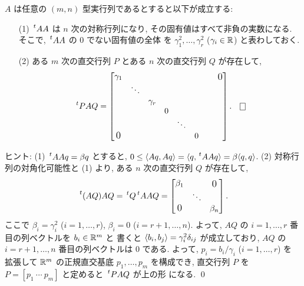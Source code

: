\documentclass[12pt,twoside]{jarticle}
\begin{document}
\begin{question}
\label{q:real-PAQ}
  $A$ は任意の $(m,n)$ 型実行列であるとすると以下が成立する:
  \begin{enumerate}
  \item[(1)] $\tp{A}A$ は $n$ 次の対称行列になり, 
    その固有値はすべて非負の実数になる.
    そこで, $\tp{A}A$ の $0$ でない固有値の全体
    を $\gamma_1^2,\dots,\gamma_r^2$ ($\gamma_i\in{\mathbb R}$) と表わしておく.
  \item[(2)] ある $m$ 次の直交行列 $P$ とある $n$ 次の直交行列 $Q$ が存在して,
    \begin{equation*}
      \tp{P}AQ = 
      \begin{bmatrix}
        \gamma_1  &        &          &   &        &   & \ & \bigzerou \\
                  & \ddots &          &   &        &   & & \\
                  &        & \gamma_r &   &        &   & & \\
                  &        &          & 0 &        &   & & \\
                  &        &          &   & \ddots &   & & \\
        \bigzerol &        &          &   &        & 0 & & \\
      \end{bmatrix}.
      \qed
    \end{equation*}
  \end{enumerate}
\end{question}

\noindent
ヒント:  (1) $\tp{A}A q = \beta q$ とすると,
$0\le\bra Aq,Aq\ket=\bra q,\tp{A}Aq\ket=\beta\bra q,q\ket$. \quad
(2) 対称行列の対角化可能性と (1) より, ある $n$ 次の直交行列 $Q$ が存在して,
\begin{equation*}
  \tp{(AQ)}AQ =
  \tp{Q}\tp{A}AQ =
  \begin{bmatrix}
    \beta_1   &        & \bigzerou \\
              & \ddots &           \\
    \bigzerol &        & \beta_n   \\
  \end{bmatrix}.
\end{equation*}
ここで $\beta_i=\gamma_i^2$ ($i=1,\dots,r$), $\beta_i=0$ ($i=r+1,\dots,n$).
よって, $AQ$ の $i=1,\dots,r$ 番目の列ベクトルを $b_i\in{\mathbb R}^m$ と
書くと $\langle b_i,b_j\rangle=\gamma_i^2 \delta_{ij}$ が成立しており, 
$AQ$ の $i=r+1,\dots,n$ 番目の列ベクトルは $0$ である.
よって, $p_i=b_i/\gamma_i$ ($i=1,\dots,r$) を
拡張して ${\mathbb R}^m$ の正規直交基底 $p_1,\dots,p_m$ を構成でき, 
直交行列 $P$ を $P=[p_1\ \cdots\ p_m]$ と定めると $\tp{P}AQ$ が上の形
になる. 
\qed
\end{document}
